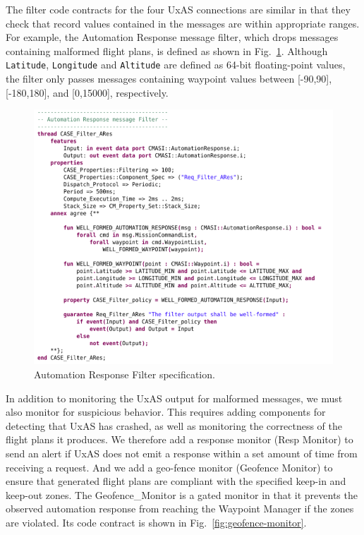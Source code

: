 \documentclass[global,twocolumn]{svjour}
\newcommand{\figref}[1]{Fig.~\ref{#1}}
\begin{document}
The filter code contracts for the four UxAS connections are similar in that they check that record values contained in the messages are within appropriate ranges.
%
For example, the Automation Response message filter, which drops messages containing malformed flight plans, is defined as shown in \figref{fig:automation-response-filter}.
%
Although \texttt{Latitude}, \texttt{Longitude} and \texttt{Altitude} are defined as 64-bit floating-point values, the filter only passes messages containing waypoint values between [-90,90], [-180,180], and [0,15000], respectively.

\begin{figure}[h]
	\centering
	\includegraphics[width=1\columnwidth]{figs/automation-response-filter.png}
	\caption{Automation Response Filter specification.}
	\label{fig:automation-response-filter}
\end{figure}

In addition to monitoring the UxAS output for malformed messages, we must also monitor for suspicious behavior.
%
This requires adding components for detecting that UxAS has crashed, as well as monitoring the correctness of the flight plans it produces.
%
We therefore add a response monitor (Resp Monitor) to send an alert if UxAS does not emit a response within a set amount of time from receiving a request.
%
And we add a geo-fence monitor (Geofence Monitor) to ensure that generated flight plans are compliant with the specified keep-in and keep-out zones.
%
The Geofence\_Monitor is a gated monitor in that it prevents the observed automation response from reaching the Waypoint Manager if the zones are violated.
%
Its code contract is shown in \figref{fig:geofence-monitor}.
\end{document}

